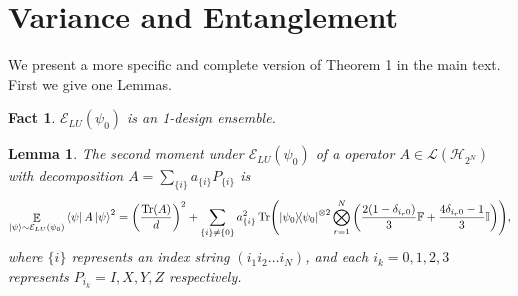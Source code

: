 \documentclass[showpacs,amsmath,amssymb,twocolumn,aps,pra,superscriptaddress,notitlepage,10pt]{revtex4-2}
\newcommand{\bE}{\mathbb E}
\newcommand{\cE}{\mathcal E_{LU}}
\newcommand{\kp}{\ket{\psi}}
\newtheorem{lemma}{Lemma}
\newtheorem{fact}{Fact}
\begin{document}
\section{Variance and Entanglement}
We present a more specific and complete version of Theorem 1 in the main text. First we give one Lemmas.
\begin{fact}
    \label{lem: 1-design}
    $\cE(\psi_0)$ is an 1-design ensemble.
\end{fact}













\begin{lemma}\label{lem: 2ndmoment}
    The second moment under $\cE(\psi_0)$ of a operator $A\in\mathcal L(\mathcal H_{2^N})$ with decomposition $A=\sum_{\{i\}}a_{\{i\}}P_{\{i\}}$ is
    \begin{equation}
        \mathop{\bE}_{\kp\sim\cE(\psi_0)}\bra{\psi}A\kp^2=\left(\frac{\Tr(A)}{d}\right)^2+\sum_{\{i\}\ne\{0\}}a_{\{i\}}^2\Tr(\ketbra{\psi_0}{\psi_0}^{\otimes 2}\bigotimes_{r=1}^{N}\left(\frac{2(1-\delta_{i_r0})}{3}\mathbb F+\frac{4\delta_{i_r0}-1}{3}\mathbb I\right)),
    \end{equation}
     where $\{i\}$ represents an index string $(i_1i_2\dots i_N)$, and each $i_k=0,1,2,3$ represents $P_{i_k}=I,X,Y,Z$ respectively.
\end{lemma}
\end{document}
